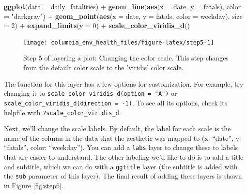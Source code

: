 \documentclass[]{tufte-book}
\newenvironment{Shaded}{}{}
\newcommand{\DataTypeTok}[1]{\textcolor[rgb]{0.56,0.13,0.00}{#1}}
\newcommand{\DecValTok}[1]{\textcolor[rgb]{0.25,0.63,0.44}{#1}}
\newcommand{\KeywordTok}[1]{\textcolor[rgb]{0.00,0.44,0.13}{\textbf{#1}}}
\newcommand{\NormalTok}[1]{#1}
\newcommand{\OperatorTok}[1]{\textcolor[rgb]{0.40,0.40,0.40}{#1}}
\newcommand{\StringTok}[1]{\textcolor[rgb]{0.25,0.44,0.63}{#1}}
\begin{document}
\begin{Shaded}
\begin{Highlighting}[]
\KeywordTok{ggplot}\NormalTok{(}\DataTypeTok{data =}\NormalTok{ daily_fatalities) }\OperatorTok{+}\StringTok{ }\KeywordTok{geom_line}\NormalTok{(}\KeywordTok{aes}\NormalTok{(}\DataTypeTok{x =}\NormalTok{ date, }
    \DataTypeTok{y =}\NormalTok{ fatals), }\DataTypeTok{color =} \StringTok{"darkgray"}\NormalTok{) }\OperatorTok{+}\StringTok{ }\KeywordTok{geom_point}\NormalTok{(}\KeywordTok{aes}\NormalTok{(}\DataTypeTok{x =}\NormalTok{ date, }
    \DataTypeTok{y =}\NormalTok{ fatals, }\DataTypeTok{color =}\NormalTok{ weekday), }\DataTypeTok{size =} \DecValTok{2}\NormalTok{) }\OperatorTok{+}\StringTok{ }
\StringTok{    }\KeywordTok{expand_limits}\NormalTok{(}\DataTypeTok{y =} \DecValTok{0}\NormalTok{) }\OperatorTok{+}\StringTok{ }\KeywordTok{scale_color_viridis_d}\NormalTok{()}
\end{Highlighting}
\end{Shaded}

\begin{figure}
\texttt{[image: columbia\_env\_health\_files/figure-latex/step5-1]} \caption[Step 5 of layering a plot]{Step 5 of layering a plot: Changing the color scale. This step changes from the default color scale to the 'viridis' color scale.}\label{fig:step5}
\end{figure}

The function for this layer has a few options for customization. For example, try
changing it to \texttt{scale\_color\_viridis\_d(option\ =\ "A")} or
\texttt{scale\_color\_viridis\_d(direction\ =\ -1)}. To see all its options, check its
helpfile with \texttt{?scale\_color\_viridis\_d}.

Next, we'll change the scale labels. By default, the label for each scale is the
name of the column in the data that the aesthetic was mapped to (x: ``date'',
y: ``fatals'', color: ``weekday''). You can add a \texttt{labs} layer to change these
to labels that are easier to understand. The other
labeling we'd like to do is to add a title and subtitle, which we can do with
a \texttt{ggtitle} layer (the subtitle is added with the \texttt{sub} parameter of this layer).
The final result of adding these layers is shown in Figure \ref{fig:step6}.
\end{document}

